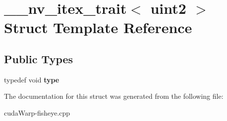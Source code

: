 \hypertarget{struct____nv__itex__trait_3_01uint2_01_4}{}\section{\+\_\+\+\_\+nv\+\_\+itex\+\_\+trait$<$ uint2 $>$ Struct Template Reference}
\label{struct____nv__itex__trait_3_01uint2_01_4}
\subsection*{Public Types}
\begin{DoxyCompactItemize}
\item 
typedef void {\bfseries type}\hypertarget{struct____nv__itex__trait_3_01uint2_01_4_aa833c00f18214e83f9cb6bc3adfcf73f}{}\label{struct____nv__itex__trait_3_01uint2_01_4_aa833c00f18214e83f9cb6bc3adfcf73f}

\end{DoxyCompactItemize}


The documentation for this struct was generated from the following file\+:\begin{DoxyCompactItemize}
\item 
cuda\+Warp-\/fisheye.\+cpp\end{DoxyCompactItemize}
